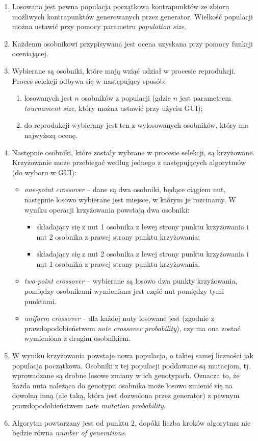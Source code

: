 \documentclass{article}
\begin{document}
\begin{enumerate}
\item Losowana jest pewna populacja początkowa kontrapunktów ze zbioru możliwych kontrapunktów generowanych przez generator. Wielkość populacji można ustawić przy pomocy parametru \emph{population size}.
\item Każdemu osobnikowi przypisywana jest ocena uzyskana przy pomocy funkcji oceniającej.
\item Wybierane są osobniki, które mają wziąć udział w procesie reprodukcji. Proces selekcji odbywa się w następujący sposób:
	\begin{enumerate}
		\item losowanych jest $n$ osobników z populacji (gdzie $n$ jest parametrem \emph{tournament size}, który można ustawić przy użyciu GUI);
		\item do reprodukcji wybierany jest ten z wylosowanych osobników, który ma najwyższą ocenę.
	\end{enumerate}

\item Następnie osobniki, które zostały wybrane w procesie selekcji, są krzyżowane. Krzyżowanie może przebiegać według jednego z następujących algorytmów (do wyboru w GUI):

	\begin{itemize}
		\item \emph{one-point crossover} -- dane są dwa osobniki, będące ciągiem nut, następnie losowo wybierane jest miejsce, w którym je rozcinamy. W wyniku operacji krzyżowania powstają dwa osobniki:
			\begin{itemize}
				\item składający się z nut 1 osobnika z lewej strony punktu krzyżowania i nut 2 osobnika z prawej strony punktu krzyżowania;
				\item składający się z nut 2 osobnika z lewej strony punktu krzyżowania i nut 1 osobnika z prawej strony punktu krzyżowania.
			\end{itemize}
		\item \emph{two-point crossover} -- wybierane są losowo dwa punkty krzyżowania, pomiędzy osobnikami wymieniana jest część nut pomiędzy tymi punktami.
		\item \emph{uniform crossover} -- dla każdej nuty losowane jest (zgodnie z prawdopodobieństwem \emph{note crossover probability}), czy ma ona zostać wymieniona z drugim osobnikiem.
	\end{itemize}

\item W wyniku krzyżowania powstaje nowa populacja, o takiej samej liczności jak populacja początkowa. Osobniki z tej populacji poddawane są mutacjom, tj. wprowadzane są drobne losowe zmiany w ich genotypach. Oznacza to, że każda nuta należąca do genotypu osobnika może losowo zmienić się na dowolną inną (ale taką, która jest dozwolona przez generator) z pewnym prawdopodobieństwem \emph{note mutation probability}. 

\item Algorytm powtarzany jest od punktu $2$, dopóki liczba kroków algorytmu nie będzie równa \emph{number of generations}.
\end{enumerate}
\end{document}
